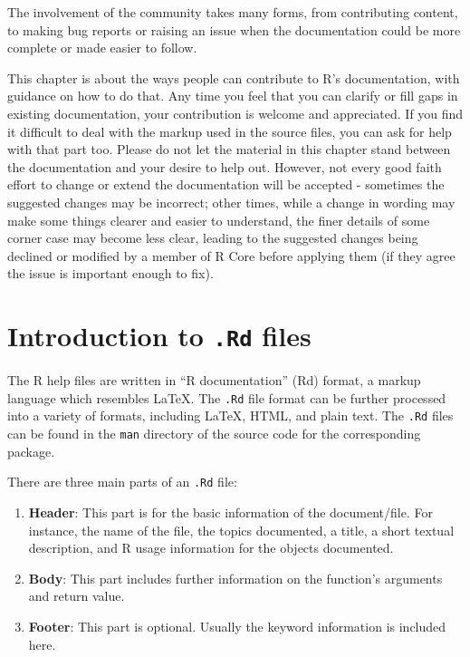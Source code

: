 \documentclass[
]{book}
\begin{document}
The involvement of the community takes many forms, from contributing content, to making bug reports or raising an issue when the documentation could be more complete or made easier to follow.

This chapter is about the ways people can contribute to R's documentation, with guidance on how to do that. Any time you feel that you can clarify or fill gaps in existing documentation, your contribution is welcome and appreciated. If you find it difficult to deal with the markup used in the source files, you can ask for help with that part too. Please do not let the material in this chapter stand between the documentation and your desire to help out. However, not every good faith effort to change or extend the documentation will be accepted - sometimes the suggested changes may be incorrect; other times, while a change in wording may make some things clearer and easier to understand, the finer details of some corner case may become less clear, leading to the suggested changes being declined or modified by a member of R Core before applying them (if they agree the issue is important enough to fix).

\section{\texorpdfstring{Introduction to \texttt{.Rd} files}{Introduction to .Rd files}}\label{introduction-to-.rd-files}

The R help files are written in ``R documentation'' (Rd) format, a markup language which resembles LaTeX. The \texttt{.Rd} file format can be further processed into a variety of formats, including LaTeX, HTML, and plain text. The \texttt{.Rd} files can be found in the \texttt{man} directory of the source code for the corresponding package.

There are three main parts of an \texttt{.Rd} file:

\begin{enumerate}
\def\labelenumi{\arabic{enumi}.}
\item
  \textbf{Header}: This part is for the basic information of the document/file. For instance, the name of the file, the topics documented, a title, a short textual description, and R usage information for the objects documented.
\item
  \textbf{Body}: This part includes further information on the function's arguments and return value.
\item
  \textbf{Footer}: This part is optional. Usually the keyword information is included here.
\end{enumerate}
\end{document}
